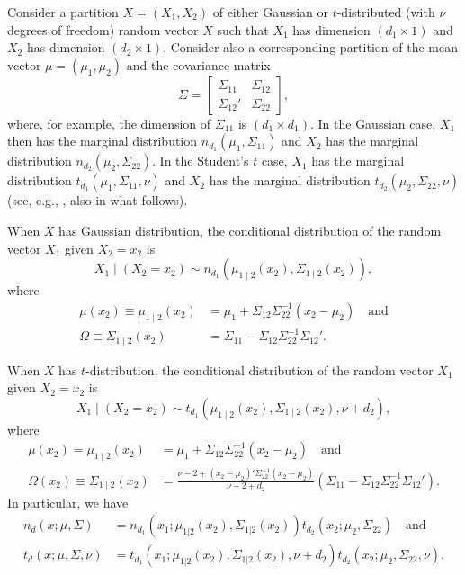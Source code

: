\documentclass[nojss]{jss}
\begin{document}
\begin{appendix}
Consider a partition $X=(X_1,X_2)$ of either Gaussian or $t$-distributed (with $\nu$ degrees of freedom) random vector $X$ such that $X_1$ has dimension $(d_1\times1)$ and $X_2$ has dimension $(d_2\times1)$. Consider also a corresponding partition of the mean vector $\mu=(\mu_1,\mu_2)$ and the covariance matrix
\begin{equation}
\Sigma=
\begin{bmatrix}
\Sigma_{11} & \Sigma_{12} \\
\Sigma_{12}' & \Sigma_{22}
\end{bmatrix},
\end{equation}
where, for example, the dimension of $\Sigma_{11}$ is $(d_1\times d_1)$.  In the Gaussian case, $X_1$ then has the marginal distribution $n_{d_1}(\mu_1,\Sigma_{11})$ and $X_2$ has the marginal distribution $n_{d_2}(\mu_2,\Sigma_{22})$.  In the Student's $t$ case,  $X_1$ has the marginal distribution $t_{d_1}(\mu_1,\Sigma_{11},\nu)$ and $X_2$ has the marginal distribution $t_{d_2}(\mu_2,\Sigma_{22},\nu)$ (see, e.g., \cite{Ding:2016}, also in what follows).

When $X$ has Gaussian distribution,  the conditional distribution of the random vector $X_1$ given $X_2=x_2$ is
\begin{equation}
X_1\mid(X_2=x_2)\sim n_{d_1}(\mu_{1\mid2}(x_2),\Sigma_{1\mid2}(x_2)),
\end{equation}
where
\begin{align}
\mu (x_2)\equiv \mu_{1\mid2}(x_2) &= \mu_1+\Sigma_{12}\Sigma_{22}^{-1}(x_2-\mu_2) \quad \text{and}\label{eq:mux_gaus} \\
\Omega \equiv \Sigma_{1\mid2}(x_2) &= \Sigma_{11}-\Sigma_{12}\Sigma_{22}^{-1}\Sigma_{12}'. \label{eq:omegax_gaus}
\end{align}

When $X$ has $t$-distribution, the conditional distribution of the random vector $X_1$ given $X_2=x_2$ is
\begin{equation}
X_1\mid(X_2=x_2)\sim t_{d_1}(\mu_{1\mid2}(x_2),\Sigma_{1\mid2}(x_2),\nu+d_2),
\end{equation}
where
\begin{align}
\mu (x_2) = \mu_{1\mid2}(x_2) &= \mu_1+\Sigma_{12}\Sigma_{22}^{-1}(x_2-\mu_2) \quad \text{and}\label{eq:mux} \\
\Omega (x_2) \equiv \Sigma_{1\mid2}(x_2) &= \frac{\nu-2+(x_2-\mu_2)'\Sigma_{22}^{-1}(x_2-\mu_2)}{\nu-2+d_2}(\Sigma_{11}-\Sigma_{12}\Sigma_{22}^{-1}\Sigma_{12}'). \label{eq:omegax}
\end{align}
In particular, we have
\begin{align}\label{eq:td_decomp}
n_d(x;\mu,\Sigma) &= n_{d_1}(x_1;\mu_{1|2}(x_2),\Sigma_{1|2}(x_2))t_{d_2}(x_2;\mu_2,\Sigma_{22}) \quad \text{and}\\
t_d(x;\mu,\Sigma,\nu) &= t_{d_1}(x_1;\mu_{1|2}(x_2),\Sigma_{1|2}(x_2),\nu+d_2)t_{d_2}(x_2;\mu_2,\Sigma_{22},\nu).
\end{align}




\end{appendix}
\end{document}
